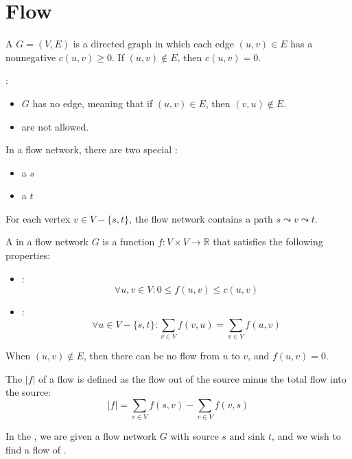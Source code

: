 \chapter{Flow}

    \par A  $G = (V, E)$ is a directed graph in which each edge $(u, v) \in E$ has a nonnegative  $c(u, v) \geq 0$. If $(u, v) \not \in E$, then $c(u, v) = 0$.
    \par {}:
      \begin{itemize}
        \item $G$ has no  edge, meaning that if $(u, v) \in E$, then $(v, u) \not \in E$.
        \item {} are not allowed.
      \end{itemize}
    \par In a flow network, there are two special :
      \begin{itemize}
        \item a  $s$
        \item a  $t$
      \end{itemize}
    \par For each vertex $v \in V - \{s, t\}$, the flow network contains a path $s \leadsto v \leadsto t$.
  
    \par A  in a flow network $G$ is a function $f: V \times V \to \mathbb{R}$ that satisfies the following properties:
      \begin{itemize}
        \item {}: 
          \[
            \forall u, v \in V: 0 \leq f(u, v) \leq c(u, v)
          \]
        \item {}:
          \[
            \forall u \in V - \{s, t\}: \sum\limits_{v \in V} f(v, u) = \sum\limits_{v \in V} f(u, v)
          \]
      \end{itemize}
    \par When $(u, v) \not \in E$, then there can be no flow from $u$ to $v$, and $f(u, v) = 0$.
    \par The  $|f|$ of a flow is defined as the flow out of the source minus the total flow into the source:
      \[
        |f| = \sum\limits_{v \in V} f(s, v) - \sum\limits_{v \in V} f(v, s)
      \]
    \par In the , we are given a flow network $G$ with source $s$ and sink $t$, and we wish to find a flow of .

